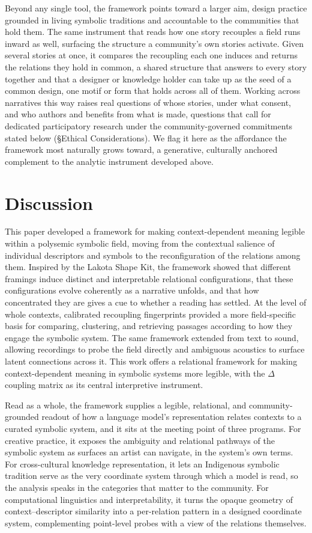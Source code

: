 \documentclass[final,creativeai]{article}
\begin{document}
Beyond any single tool, the framework points toward a larger aim, design practice grounded in living symbolic traditions and accountable to the communities that hold them. The same instrument that reads how one story recouples a field runs inward as well, surfacing the structure a community's own stories activate. Given several stories at once, it compares the recoupling each one induces and returns the relations they hold in common, a shared structure that answers to every story together and that a designer or knowledge holder can take up as the seed of a common design, one motif or form that holds across all of them. Working across narratives this way raises real questions of whose stories, under what consent, and who authors and benefits from what is made, questions that call for dedicated participatory research under the community-governed commitments stated below (\S Ethical Considerations). We flag it here as the affordance the framework most naturally grows toward, a generative, culturally anchored complement to the analytic instrument developed above.

\FloatBarrier
\section{Discussion}
\label{sec:discussion}
This paper developed a framework for making context-dependent meaning legible within a polysemic symbolic field, moving from the contextual salience of individual descriptors and symbols to the reconfiguration of the relations among them. Inspired by the Lakota Shape Kit, the framework showed that different framings induce distinct and interpretable relational configurations, that these configurations evolve coherently as a narrative unfolds, and that how concentrated they are gives a cue to whether a reading has settled. At the level of whole contexts, calibrated recoupling fingerprints provided a more field-specific basis for comparing, clustering, and retrieving passages according to how they engage the symbolic system. The same framework extended from text to sound, allowing recordings to probe the field directly and ambiguous acoustics to surface latent connections across it. This work offers a relational framework for making context-dependent meaning in symbolic systems more legible, with the $\Delta$ coupling matrix as its central interpretive instrument.

Read as a whole, the framework supplies a legible, relational, and community-grounded readout of how a language model's representation relates contexts to a curated symbolic system, and it sits at the meeting point of three programs. For creative practice, it exposes the ambiguity and relational pathways of the symbolic system as surfaces an artist can navigate, in the system's own terms. For cross-cultural knowledge representation, it lets an Indigenous symbolic tradition serve as the very coordinate system through which a model is read, so the analysis speaks in the categories that matter to the community. For computational linguistics and interpretability, it turns the opaque geometry of context--descriptor similarity into a per-relation pattern in a designed coordinate system, complementing point-level probes with a view of the relations themselves.
\end{document}
